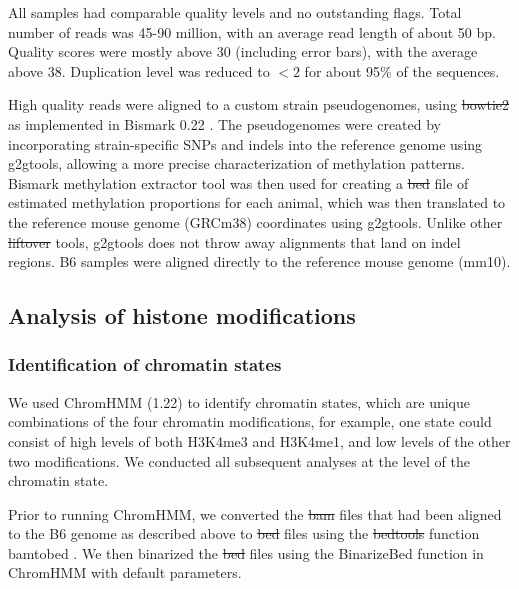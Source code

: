 \documentclass[
  11pt,
]{article}
\providecommand{\DIFaddtex}[1]{{\protect\color{blue}\uwave{#1}}} %
\providecommand{\DIFdeltex}[1]{{\protect\color{red}\sout{#1}}}                      %
\providecommand{\DIFaddbegin}{} %
\providecommand{\DIFaddend}{} %
\providecommand{\DIFdelbegin}{} %
\providecommand{\DIFdelend}{} %
\providecommand{\DIFadd}[1]{\texorpdfstring{\DIFaddtex{#1}}{#1}} %
\providecommand{\DIFdel}[1]{\texorpdfstring{\DIFdeltex{#1}}{}} %
\newcommand{\DIFscaledelfig}{0.5}
\newlength{\DIFdelgraphicswidth} %
\newlength{\DIFdelgraphicsheight} %
\newcommand{\DIFaddincludegraphics}[2][]{{\color{blue}\fbox{\DIFOincludegraphics[#1]{#2}}}} %
\newcommand{\DIFdelincludegraphics}[2][]{%
\sbox{\DIFdelgraphicsbox}{\DIFOincludegraphics[#1]{#2}}%
\settoboxwidth{\DIFdelgraphicswidth}{\DIFdelgraphicsbox} %
\settoboxtotalheight{\DIFdelgraphicsheight}{\DIFdelgraphicsbox} %
\scalebox{\DIFscaledelfig}{%
\parbox[b]{\DIFdelgraphicswidth}{\usebox{\DIFdelgraphicsbox}\\[-\baselineskip] \rule{\DIFdelgraphicswidth}{0em}}\llap{\resizebox{\DIFdelgraphicswidth}{\DIFdelgraphicsheight}{%
\setlength{\unitlength}{\DIFdelgraphicswidth}%
\begin{picture}(1,1)%
\thicklines\linethickness{2pt} %
{\color[rgb]{1,0,0}\put(0,0){\framebox(1,1){}}}%
{\color[rgb]{1,0,0}\put(0,0){\line( 1,1){1}}}%
{\color[rgb]{1,0,0}\put(0,1){\line(1,-1){1}}}%
\end{picture}%
}\hspace*{3pt}}} %
} %
\DeclareRobustCommand{\DIFaddbegin}{\DIFOaddbegin \let\includegraphics\DIFaddincludegraphics} %
\DeclareRobustCommand{\DIFaddend}{\DIFOaddend \let\includegraphics\DIFOincludegraphics} %
\DeclareRobustCommand{\DIFdelbegin}{\DIFOdelbegin \let\includegraphics\DIFdelincludegraphics} %
\DeclareRobustCommand{\DIFdelend}{\DIFOaddend \let\includegraphics\DIFOincludegraphics} %
\begin{document}
All samples had comparable quality levels and no outstanding flags.
Total number of reads was 45-90 million, with an average read length of
about 50 bp. Quality scores were mostly above 30 (including error bars),
with the average above 38. Duplication level was reduced to \(<2\) for
about 95\% of the sequences.

High quality reads were aligned to a custom strain pseudogenomes, using
\DIFdelbegin \DIFdel{bowtie2 }\DIFdelend \DIFaddbegin \DIFadd{Bowtie 2 }\DIFaddend as implemented in Bismark 0.22 \citep{pmid21493656}. The
pseudogenomes were created by incorporating strain-specific SNPs and
indels into the reference genome using g2gtools, allowing a more precise
characterization of methylation patterns. Bismark methylation extractor
tool was then used for creating a \DIFdelbegin \DIFdel{bed }\DIFdelend \DIFaddbegin \DIFadd{BED }\DIFaddend file of estimated methylation
proportions for each animal, which was then translated to the reference
mouse genome (GRCm38) coordinates using g2gtools. Unlike other \DIFdelbegin \DIFdel{liftover
}\DIFdelend \DIFaddbegin \DIFadd{liftOver
}\DIFaddend tools, g2gtools does not throw away alignments that land on indel
regions. B6 samples were aligned directly to the reference mouse genome
(mm10).

\hypertarget{analysis-of-histone-modifications}{%
\subsection{Analysis of histone
modifications}\label{analysis-of-histone-modifications}}

\hypertarget{identification-of-chromatin-states}{%
\subsubsection{Identification of chromatin
states}\label{identification-of-chromatin-states}}

We used ChromHMM (1.22) \citep{pmid29120462} to identify chromatin
states, which are unique combinations of the four chromatin
modifications, for example, one state could consist of high levels of
both H3K4me3 and H3K4me1, and low levels of the other two modifications.
We conducted all subsequent analyses at the level of the chromatin
state.

Prior to running ChromHMM, we converted the \DIFdelbegin \DIFdel{bam }\DIFdelend \DIFaddbegin \DIFadd{BAM }\DIFaddend files that had been
aligned to the B6 genome as described above to \DIFdelbegin \DIFdel{bed }\DIFdelend \DIFaddbegin \DIFadd{BED }\DIFaddend files using the
\DIFdelbegin \DIFdel{bedtools }\DIFdelend \DIFaddbegin \DIFadd{BEDTools }\DIFaddend function bamtobed \citep{quinlan2010bedtools}. We then
binarized the \DIFdelbegin \DIFdel{bed }\DIFdelend \DIFaddbegin \DIFadd{BED }\DIFaddend files using the BinarizeBed function in ChromHMM with
default parameters.
\end{document}
